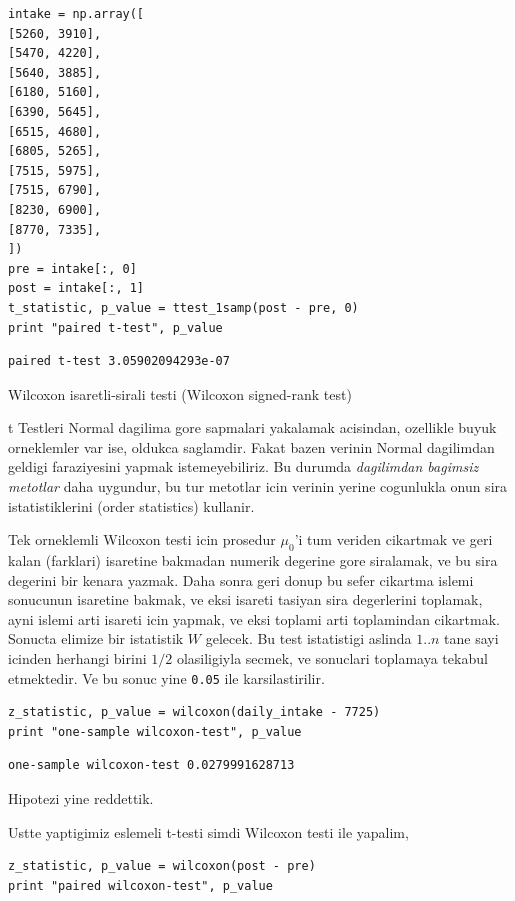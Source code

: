 \documentclass[12pt,fleqn]{article}\usepackage{../common}
\begin{document}
\begin{verbatim}
intake = np.array([
[5260, 3910],
[5470, 4220],
[5640, 3885],
[6180, 5160],
[6390, 5645],
[6515, 4680],
[6805, 5265],
[7515, 5975],
[7515, 6790],
[8230, 6900],
[8770, 7335],
])
pre = intake[:, 0]
post = intake[:, 1]
t_statistic, p_value = ttest_1samp(post - pre, 0)
print "paired t-test", p_value
\end{verbatim}

\begin{verbatim}
paired t-test 3.05902094293e-07
\end{verbatim}

Wilcoxon isaretli-sirali testi (Wilcoxon signed-rank test)

t Testleri Normal dagilima gore sapmalari yakalamak acisindan,
ozellikle buyuk orneklemler var ise, oldukca saglamdir. Fakat bazen
verinin Normal dagilimdan geldigi faraziyesini yapmak istemeyebiliriz.
Bu durumda {\em dagilimdan bagimsiz metotlar} daha uygundur, bu tur
metotlar icin verinin yerine cogunlukla onun sira istatistiklerini
(order statistics) kullanir.

Tek orneklemli Wilcoxon testi icin prosedur $\mu_0$'i tum veriden
cikartmak ve geri kalan (farklari) isaretine bakmadan numerik degerine
gore siralamak, ve bu sira degerini bir kenara yazmak. Daha sonra geri
donup bu sefer cikartma islemi sonucunun isaretine bakmak, ve eksi
isareti tasiyan sira degerlerini toplamak, ayni islemi arti isareti
icin yapmak, ve eksi toplami arti toplamindan cikartmak. Sonucta
elimize bir istatistik $W$ gelecek. Bu test istatistigi aslinda $1..n$
tane sayi icinden herhangi birini $1/2$ olasiligiyla secmek, ve
sonuclari toplamaya tekabul etmektedir. Ve bu sonuc yine \verb!0.05!
ile karsilastirilir.

\begin{verbatim}
z_statistic, p_value = wilcoxon(daily_intake - 7725)
print "one-sample wilcoxon-test", p_value
\end{verbatim}

\begin{verbatim}
one-sample wilcoxon-test 0.0279991628713
\end{verbatim}

Hipotezi yine reddettik.

Ustte yaptigimiz eslemeli t-testi simdi Wilcoxon testi ile yapalim,

\begin{verbatim}
z_statistic, p_value = wilcoxon(post - pre)
print "paired wilcoxon-test", p_value
\end{verbatim}
\end{document}
